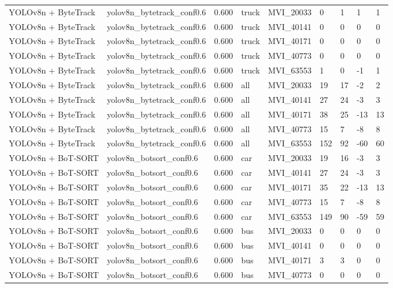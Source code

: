 \begin{tabular}{lllllllll}
YOLOv8n + ByteTrack & yolov8n\_bytetrack\_conf0.6 & 0.600 & truck & MVI\_20033 & 0 & 1 & 1 & 1 \\
YOLOv8n + ByteTrack & yolov8n\_bytetrack\_conf0.6 & 0.600 & truck & MVI\_40141 & 0 & 0 & 0 & 0 \\
YOLOv8n + ByteTrack & yolov8n\_bytetrack\_conf0.6 & 0.600 & truck & MVI\_40171 & 0 & 0 & 0 & 0 \\
YOLOv8n + ByteTrack & yolov8n\_bytetrack\_conf0.6 & 0.600 & truck & MVI\_40773 & 0 & 0 & 0 & 0 \\
YOLOv8n + ByteTrack & yolov8n\_bytetrack\_conf0.6 & 0.600 & truck & MVI\_63553 & 1 & 0 & -1 & 1 \\
YOLOv8n + ByteTrack & yolov8n\_bytetrack\_conf0.6 & 0.600 & all & MVI\_20033 & 19 & 17 & -2 & 2 \\
YOLOv8n + ByteTrack & yolov8n\_bytetrack\_conf0.6 & 0.600 & all & MVI\_40141 & 27 & 24 & -3 & 3 \\
YOLOv8n + ByteTrack & yolov8n\_bytetrack\_conf0.6 & 0.600 & all & MVI\_40171 & 38 & 25 & -13 & 13 \\
YOLOv8n + ByteTrack & yolov8n\_bytetrack\_conf0.6 & 0.600 & all & MVI\_40773 & 15 & 7 & -8 & 8 \\
YOLOv8n + ByteTrack & yolov8n\_bytetrack\_conf0.6 & 0.600 & all & MVI\_63553 & 152 & 92 & -60 & 60 \\
YOLOv8n + BoT-SORT & yolov8n\_botsort\_conf0.6 & 0.600 & car & MVI\_20033 & 19 & 16 & -3 & 3 \\
YOLOv8n + BoT-SORT & yolov8n\_botsort\_conf0.6 & 0.600 & car & MVI\_40141 & 27 & 24 & -3 & 3 \\
YOLOv8n + BoT-SORT & yolov8n\_botsort\_conf0.6 & 0.600 & car & MVI\_40171 & 35 & 22 & -13 & 13 \\
YOLOv8n + BoT-SORT & yolov8n\_botsort\_conf0.6 & 0.600 & car & MVI\_40773 & 15 & 7 & -8 & 8 \\
YOLOv8n + BoT-SORT & yolov8n\_botsort\_conf0.6 & 0.600 & car & MVI\_63553 & 149 & 90 & -59 & 59 \\
YOLOv8n + BoT-SORT & yolov8n\_botsort\_conf0.6 & 0.600 & bus & MVI\_20033 & 0 & 0 & 0 & 0 \\
YOLOv8n + BoT-SORT & yolov8n\_botsort\_conf0.6 & 0.600 & bus & MVI\_40141 & 0 & 0 & 0 & 0 \\
YOLOv8n + BoT-SORT & yolov8n\_botsort\_conf0.6 & 0.600 & bus & MVI\_40171 & 3 & 3 & 0 & 0 \\
YOLOv8n + BoT-SORT & yolov8n\_botsort\_conf0.6 & 0.600 & bus & MVI\_40773 & 0 & 0 & 0 & 0 \\

\end{tabular}
